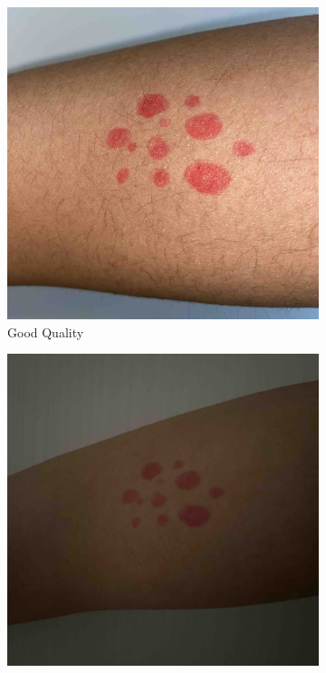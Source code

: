 \begin{figure}[ht]
    \centering
    \begin{subfigure}[b]{0.24\textwidth}
        \includegraphics[width=\textwidth]{img/Reference.jpg}
        \caption{Good Quality}
    \end{subfigure}
    \hfill
    \begin{subfigure}[b]{0.24\textwidth}
        \includegraphics[width=\textwidth]{img/Lighting.jpg}

\end{subfigure}
\end{figure}

